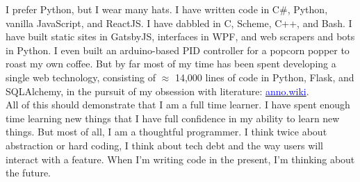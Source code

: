 \documentclass[9pt]{developercv} %
\begin{document}



I prefer Python, but I wear many hats. I have written code in C\#,
Python, vanilla JavaScript, and ReactJS. I have dabbled in C, Scheme, C++,
and Bash. I have built static sites in GatsbyJS, interfaces in WPF, and web
scrapers and bots in Python. I even built an arduino-based PID controller
for a popcorn popper to roast my own coffee. But by far most of my time has
been spent developing a single web technology, consisting of $\approx$
14,000 lines of code in Python, Flask, and SQLAlchemy, in the pursuit of my
obsession with literature:
{\href{https://github.com/malan88/icc}{\textcolor{Blue}{anno.wiki}}}.\\

All of this should demonstrate that I am a full time learner. I have spent
enough time learning new things that I have full confidence in my ability to
learn new things. But most of all, I am a thoughtful programmer. I think
twice about abstraction or hard coding, I think about tech debt and the way
users will interact with a feature. When I'm writing code in the present,
I'm thinking about the future.


\end{document}
